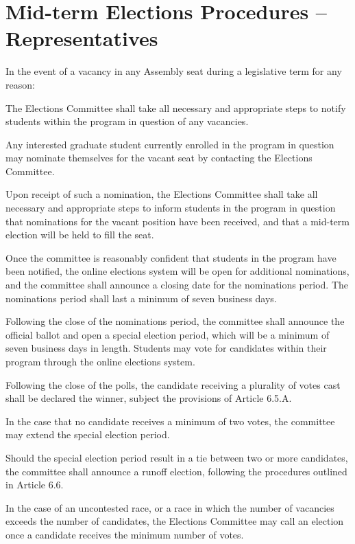 \section{Mid-term Elections Procedures – Representatives}
In the event of a vacancy in any Assembly seat during a legislative term for any reason:
\begin{bylaws-number}
  \item The Elections Committee shall take all necessary and appropriate steps to notify students within the program in question of any vacancies.
  \item Any interested graduate student currently enrolled in the program in question may nominate themselves for the vacant seat by contacting the Elections Committee.
  \item Upon receipt of such a nomination, the Elections Committee shall take all necessary and appropriate steps to inform students in the program in question that nominations for the vacant position have been received, and that a mid-term election will be held to fill the seat.
  \item Once the committee is reasonably confident that students in the program have been notified, the online elections system will be open for additional nominations, and the committee shall announce a closing date for the nominations period. The nominations period shall last a minimum of seven business days.
  \item Following the close of the nominations period, the committee shall announce the official ballot and open a special election period, which will be a minimum of seven business days in length. Students may vote for candidates within their program through the online elections system.
  \item Following the close of the polls, the candidate receiving a plurality of votes cast shall be declared the winner, subject the provisions of Article 6.5.A.
  \begin{bylaws-number}
   \item In the case that no candidate receives a minimum of two votes, the committee may extend the special election period.
   \item Should the special election period result in a tie between two or more candidates, the committee shall announce a runoff election, following the procedures outlined in Article 6.6.
   \item In the case of an uncontested race, or a race in which the number of vacancies exceeds the number of candidates, the Elections Committee may call an election once a candidate receives the minimum number of votes.

\end{bylaws-number}
\end{bylaws-number}
